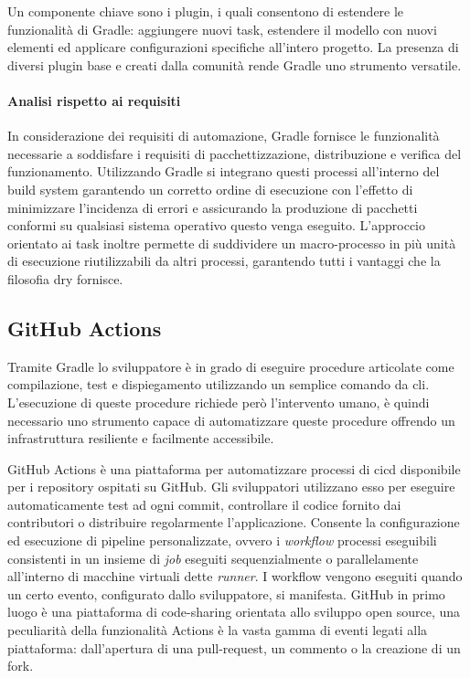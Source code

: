 Un componente chiave sono i plugin, i quali consentono di estendere le funzionalità di Gradle: aggiungere nuovi task, estendere il modello con nuovi elementi ed applicare configurazioni specifiche all'intero progetto. La presenza di diversi plugin base e creati dalla comunità rende Gradle uno strumento versatile.

\paragraph{Analisi rispetto ai requisiti}
In considerazione dei requisiti di automazione, Gradle fornisce le funzionalità necessarie a soddisfare i requisiti di pacchettizzazione, distribuzione e verifica del funzionamento. Utilizzando Gradle si integrano questi processi all'interno del build system garantendo un corretto ordine di esecuzione con l'effetto di minimizzare l'incidenza di errori e assicurando la produzione di pacchetti conformi su qualsiasi sistema operativo questo venga eseguito.
L'approccio orientato ai task inoltre permette di suddividere un macro-processo in più unità di esecuzione riutilizzabili da altri processi, garantendo tutti i vantaggi che la filosofia \ac{dry} fornisce.

\subsection{GitHub Actions}

Tramite Gradle lo sviluppatore è in grado di eseguire procedure articolate come compilazione, test e dispiegamento utilizzando un semplice comando da \ac{cli}. L'e\-se\-cu\-zio\-ne di queste procedure richiede però l'intervento umano, è quindi necessario uno strumento capace di automatizzare queste procedure offrendo un infrastruttura resiliente e facilmente accessibile.

GitHub Actions è una piattaforma per automatizzare processi di \ac{cicd} disponibile per i repository ospitati su GitHub. Gli sviluppatori utilizzano esso per eseguire automaticamente test ad ogni commit, controllare il codice fornito dai contributori o distribuire regolarmente l'applicazione. Consente la configurazione ed esecuzione di pipeline personalizzate, ovvero i \textit{workflow} processi eseguibili consistenti in un insieme di \textit{job} eseguiti sequenzialmente o parallelamente all'interno di macchine virtuali dette \textit{runner}. I workflow vengono eseguiti quando un certo evento, configurato dallo sviluppatore, si manifesta. GitHub in primo luogo è una piattaforma di code-sharing orientata allo sviluppo open source, una peculiarità della funzionalità Actions è la vasta gamma di eventi legati alla piattaforma: dall'apertura di una pull-request, un commento o la creazione di un fork.

